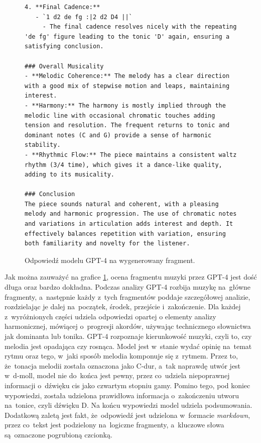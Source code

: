 \documentclass[data-science]{agh-wi} %
\begin{document}
\begin{figure}[ht!]
\begin{verbatim}
4. **Final Cadence:**
   - `1 d2 de fg :|2 d2 D4 ||`
     - The final cadence resolves nicely with the repeating 'de fg' figure leading to the tonic 'D' again, ensuring a satisfying conclusion.

### Overall Musicality
- **Melodic Coherence:** The melody has a clear direction with a good mix of stepwise motion and leaps, maintaining interest.
- **Harmony:** The harmony is mostly implied through the melodic line with occasional chromatic touches adding tension and resolution. The frequent returns to tonic and dominant notes (C and G) provide a sense of harmonic stability.
- **Rhythmic Flow:** The piece maintains a consistent waltz rhythm (3/4 time), which gives it a dance-like quality, adding to its musicality.

### Conclusion
The piece sounds natural and coherent, with a pleasing melody and harmonic progression. The use of chromatic notes and variations in articulation adds interest and depth. It effectively balances repetition with variation, ensuring both familiarity and novelty for the listener.
\end{verbatim}
    \caption{Odpowiedź modelu GPT-4 na wygenerowany fragment.}\label{code:gpt4good}
\end{figure}

Jak można zauważyć na grafice \ref*{code:gpt4good}, ocena fragmentu muzyki przez GPT-4 jest dość długa oraz bardzo dokładna. Podczas analizy GPT-4 rozbija muzykę na~główne fragmenty, a~następnie każdy z~tych fragmentów poddaje szczegółowej analizie, rozdzielając je dalej na~początek, środek, przejście i~zakończenie. Dla każdej z~wyróżnionych części udziela odpowiedzi opartej o elementy analizy harmonicznej, mówiącej o~progresji akordów, używając technicznego słownictwa jak dominanta lub tonika. GPT-4 rozpoznaje kierunkowość muzyki, czyli to, czy melodia jest opadająca czy rosnąca. Model jest w~stanie wydać opinię na~temat rytmu oraz tego, w~jaki sposób melodia komponuje się z~rytmem. Przez to, że~tonacja melodii została oznaczona jako C-dur, a~tak naprawdę utwór jest w~d-moll, model nie do~końca jest pewny, przez co~udziela niepoprawnej informacji o~dźwięku cis jako czwartym stopniu gamy. Pomino tego, pod koniec wypowiedzi, została udzielona prawidłowa informacja o~zakończeniu utworu na~tonice, czyli dźwięku D. Na końcu wypowiedzi model udziela podsumowania. Dodatkową zaletą jest fakt, że~odpowiedź jest udzielona w~formacie \textit{markdown}, przez co~tekst jest podzielony na~logiczne fragmenty, a~kluczowe słowa są~oznaczone pogrubioną czcionką.
\end{document}
